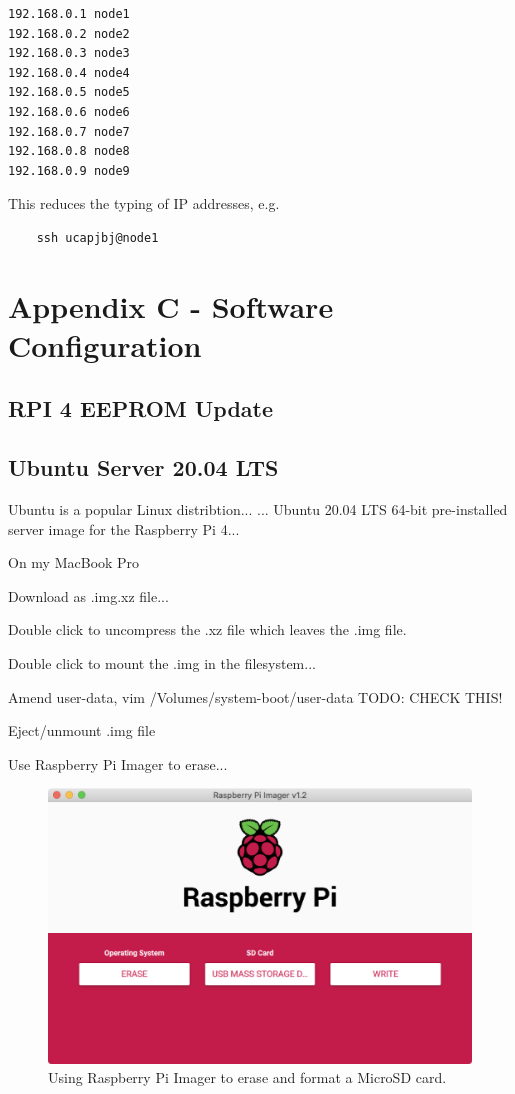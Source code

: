 \documentclass{article}
\begin{document}
\begin{verbatim}
192.168.0.1 node1
192.168.0.2 node2
192.168.0.3 node3
192.168.0.4 node4
192.168.0.5 node5
192.168.0.6 node6
192.168.0.7 node7
192.168.0.8 node8
192.168.0.9 node9
\end{verbatim}

This reduces the typing of IP addresses, e.g.

\begin{verbatim}
    ssh ucapjbj@node1
\end{verbatim}

%
%
\section{Appendix C - Software Configuration}

\subsection{RPI 4 EEPROM Update}

\subsection{Ubuntu Server 20.04 LTS}

Ubuntu is a popular Linux distribtion... ... Ubuntu 20.04 LTS 64-bit pre-installed server image for the Raspberry Pi 4...

On my MacBook Pro

Download as .img.xz file...

Double click to uncompress the .xz file which leaves the .img file. 

Double click to mount the .img in the filesystem...

Amend user-data, vim /Volumes/system-boot/user-data TODO: CHECK THIS!

Eject/unmount .img file

Use Raspberry Pi Imager to erase...

\begin{figure}
	\centering	
	\includegraphics[width=1.0\textwidth]{screenshots/imager-erase.png}
	\caption{Using Raspberry Pi Imager to erase and format a MicroSD card.}
\end{figure}
\end{document}
